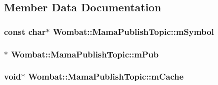 \subsection{Member Data Documentation}
\hypertarget{classWombat_1_1MamaPublishTopic_ab6c583c703d2c1b238cbeb5952f2f516}{
\subsubsection[{mSymbol}]{\setlength{\rightskip}{0pt plus 5cm}const char$\ast$ {\bf Wombat::MamaPublishTopic::mSymbol}}}
\label{classWombat_1_1MamaPublishTopic_ab6c583c703d2c1b238cbeb5952f2f516}
\hypertarget{classWombat_1_1MamaPublishTopic_a891079d45abe288278240d319a9d243f}{
\subsubsection[{mPub}]{$\ast$ {\bf Wombat::MamaPublishTopic::mPub}}}
\label{classWombat_1_1MamaPublishTopic_a891079d45abe288278240d319a9d243f}
\hypertarget{classWombat_1_1MamaPublishTopic_a59240f9b74899a0812c8915b733ae251}{
\subsubsection[{mCache}]{\setlength{\rightskip}{0pt plus 5cm}void$\ast$ {\bf Wombat::MamaPublishTopic::mCache}}}
\label{classWombat_1_1MamaPublishTopic_a59240f9b74899a0812c8915b733ae251}
